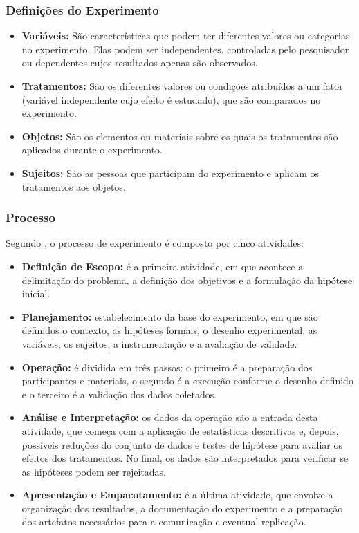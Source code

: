 \subsubsection{Definições do Experimento}

\begin{itemize}
    \item \textbf{Variáveis:} São características que podem ter diferentes valores ou categorias no experimento. Elas podem ser independentes, controladas pelo pesquisador ou dependentes cujos resultados apenas são observados.
    \item \textbf{Tratamentos:} São os diferentes valores ou condições atribuídos a um fator (variável independente cujo efeito é estudado), que são comparados no experimento.
    \item \textbf{Objetos:} São os elementos ou materiais sobre os quais os tratamentos são aplicados durante o experimento.
    \item \textbf{Sujeitos:} São as pessoas que participam do experimento e aplicam os tratamentos aos objetos.
\end{itemize}

\subsubsection{Processo}

Segundo , o processo de experimento é composto por cinco atividades:

\begin{itemize}
    \item \textbf{Definição de Escopo:} é a primeira atividade, em que acontece a delimitação do problema, a definição dos objetivos e a formulação da hipótese inicial.
    \item \textbf{Planejamento:} estabelecimento da base do experimento, em que são definidos o contexto, as hipóteses formais, o desenho experimental, as variáveis, os sujeitos, a instrumentação e a avaliação de validade.
    \item \textbf{Operação:} é dividida em três passos: o primeiro é a preparação dos participantes e materiais, o segundo é a execução conforme o desenho definido e o terceiro é a validação dos dados coletados.
    \item \textbf{Análise e Interpretação:} os dados da operação são a entrada desta atividade, que começa com a aplicação de estatísticas descritivas e, depois, possíveis reduções do conjunto de dados e testes de hipótese para avaliar os efeitos dos tratamentos. No final, os dados são interpretados para verificar se as hipóteses podem ser rejeitadas.
    \item \textbf{Apresentação e Empacotamento:} é a última atividade, que envolve a organização dos resultados, a documentação do experimento e a preparação dos artefatos necessários para a comunicação e eventual replicação.
\end{itemize}

